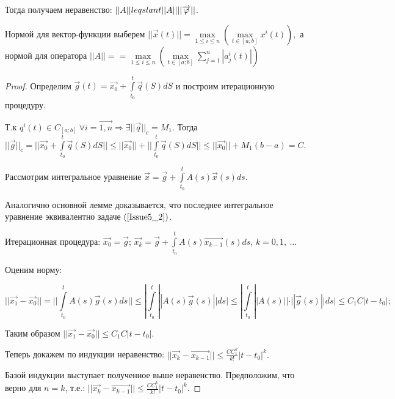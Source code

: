 Тогда получаем неравенство: $||A|| \\leqslant ||A||||\overrightarrow{\varphi}||$.

Нормой для вектор-функции выберем $||\overrightarrow{x}(t)|| = \max\limits_{1 \leqslant i \leqslant n} (\max\limits_{t \in [a;b]} x^i(t)),$ а нормой для оператора $||A|| = = \max\limits_{1 \leqslant i \leqslant n} (\max\limits_{t \in [a;b]} \sum\limits_{j = 1}^{n} |a_j^i(t)|)$

\begin{proof}

Определим $\overrightarrow{g}(t) = \overrightarrow{x_0} + \int\limits_{t_0}^{t} \overrightarrow{q}(S)dS$ и построим итерационную процедуру.

Т.к $q^i(t) \in C_{[a;b]}\ \forall i = \overrightarrow{1,n} \Rightarrow \exists ||\overrightarrow{q}||_c = M_1.$ Тогда $||\overrightarrow{g}||_c = ||\overrightarrow{x_0} + \int\limits_{t_0}^{t}\overrightarrow{q}(S)dS|| \leqslant ||\overrightarrow{x_0}|| + ||\int\limits_{t_0}^{t}\overrightarrow{q}(S)dS|| \leqslant ||\overrightarrow{x_0}|| + M_1(b-a) = C.$

Рассмотрим интегральное уравнение $\overrightarrow{x} = \overrightarrow{g} + \int\limits_{t_0}^{t}A(s)\overrightarrow{x}(s)ds$.

Аналогично основной лемме доказывается, что последнее интегральное уравнение эквивалентно задаче $(\ref{Issue5_2})$.

Итерационная процедура: $\overrightarrow{x_0} = \overrightarrow{g}$; $\overrightarrow{x_k} = \overrightarrow{g} + \int\limits_{t_0}^{t} A(s)\overrightarrow{x_{k-1}}(s)ds $, $k = 0,1,\ \dots$

Оценим норму:

$$ ||\overrightarrow{x_1} - \overrightarrow{x_0}|| = || \int\limits_{t_0}^{t} A(s)\overrightarrow{g}(s)ds || \leqslant | \int\limits_{t_0}^{t} ||A(s)\overrightarrow{g}(s)||ds | \leqslant  | \int\limits_{t_0}^{t} ||A(s)||\cdot ||\overrightarrow{g}(s)||ds | \leqslant C_1 C |t - t_0|;$$ 

Таким образом $||\overrightarrow{x_1} -\overrightarrow{x_0}|| \leqslant C_1C|t-t_0|.$

Теперь докажем по индукции неравенство: $||\overrightarrow{x_k} - \overrightarrow{x_{k-1}}|| \leqslant \frac{CC_1^k}{k!}|t-t_0|^k.$

Базой индукции выступает полученное выше неравенство. Предположим, что верно для $n = k$, т.е.: $||\overrightarrow{x_k} - \overrightarrow{x_{k-1}}|| \leqslant \frac{CC_1^k}{k!}|t-t_0|^k.$


\end{proof}
